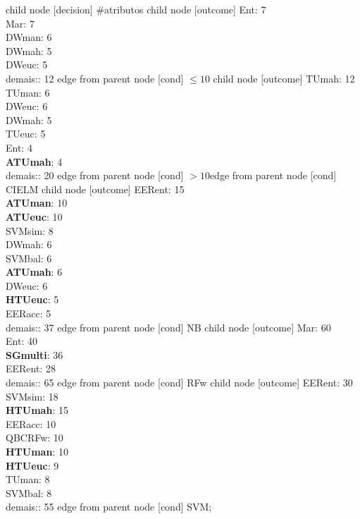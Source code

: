 child {node [decision] {\#atributos}
child {node [outcome] {Ent: 7\\
Mar: 7\\
DWman: 6\\
DWmah: 5\\
DWeuc: 5\\
demais:: 12} edge from parent node [cond] {$\leq10$}}
child {node [outcome] {TUmah: 12\\
TUman: 6\\
DWeuc: 6\\
DWmah: 5\\
TUeuc: 5\\
Ent: 4\\
\textbf{ATUmah}: 4\\
demais:: 20} edge from parent node [cond] {$>10$}}edge from parent node [cond] {CIELM}}
child {node [outcome] {EERent: 15\\
\textbf{ATUman}: 10\\
\textbf{ATUeuc}: 10\\
SVMsim: 8\\
DWmah: 6\\
SVMbal: 6\\
\textbf{ATUmah}: 6\\
DWeuc: 6\\
\textbf{HTUeuc}: 5\\
EERacc: 5\\
demais:: 37} edge from parent node [cond] {NB}}
child {node [outcome] {Mar: 60\\
Ent: 40\\
\textbf{SGmulti}: 36\\
EERent: 28\\
demais:: 65} edge from parent node [cond] {RFw}}
child {node [outcome] {EERent: 30\\
SVMsim: 18\\
\textbf{HTUmah}: 15\\
EERacc: 10\\
QBCRFw: 10\\
\textbf{HTUman}: 10\\
\textbf{HTUeuc}: 9\\
TUman: 8\\
SVMbal: 8\\
demais:: 55} edge from parent node [cond] {SVM}};